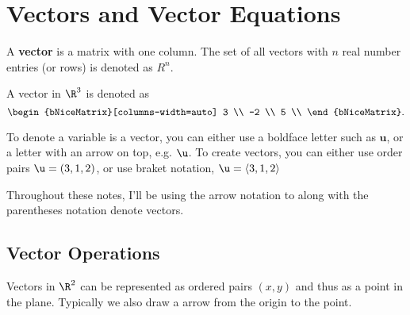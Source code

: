 
\section{Vectors and Vector Equations}
\label{sec:vectors_and_vector_equations}

\begin{definition}[Vector]
  \label{def:vector}

  A \textbf{vector} is a matrix with one column. The set of all vectors with $n$
  real number entries (or rows) is denoted as $R^n$.
\end{definition}

\begin{example}
  \label{exm:vector}

  A vector in $\R^3$ is denoted as
  \[%
    \begin{bNiceMatrix}[columns-width=auto]
      3 \\
      -2 \\
      5 \\
    \end{bNiceMatrix}
  .\]%
\end{example}

\begin{notation}
  \label{ntn:ways_to_denote_a_vector}

  To denote a variable is a vector, you can either use a boldface letter such as
  $\mathbf{u}$, or a letter with an arrow on top, e.g. $\u$. To create vectors,
  you can either use order pairs $\u = (3, 1, 2)$, or use braket notation, $\u =
  \langle 3, 1, 2 \rangle$
\end{notation}

\begin{note}
  \label{nte:ways_to_denote_a_vector}

  Throughout these notes, I'll be using the arrow notation to along with the
  parentheses notation denote vectors.
\end{note}

\subsection{Vector Operations}
\label{sub_sec:vector_operations}

Vectors in $\R^2$ can be represented as ordered pairs $(x, y)$ and thus as a
point in the plane. Typically we also draw a arrow from the origin to the point.

